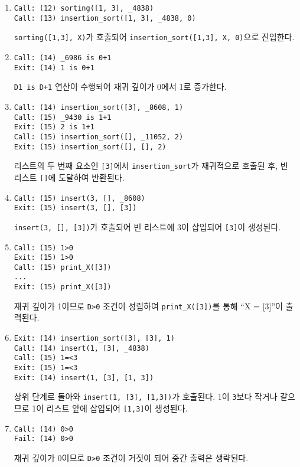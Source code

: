 \documentclass{article}
\begin{document}
\begin{enumerate}

\item
\begin{verbatim}
Call: (12) sorting([1, 3], _4838)
Call: (13) insertion_sort([1, 3], _4838, 0)
\end{verbatim}
\texttt{sorting([1,3], X)}가 호출되어 \texttt{insertion\_sort([1,3], X, 0)}으로 진입한다.

\item
\begin{verbatim}
Call: (14) _6986 is 0+1
Exit: (14) 1 is 0+1
\end{verbatim}
\texttt{D1 is D+1} 연산이 수행되어 재귀 깊이가 0에서 1로 증가한다.

\item
\begin{verbatim}
Call: (14) insertion_sort([3], _8608, 1)
Call: (15) _9430 is 1+1
Exit: (15) 2 is 1+1
Call: (15) insertion_sort([], _11052, 2)
Exit: (15) insertion_sort([], [], 2)
\end{verbatim}
리스트의 두 번째 요소인 \texttt{[3]}에서 \texttt{insertion\_sort}가 재귀적으로 호출된 후, 빈 리스트 \texttt{[]}에 도달하여 반환된다.

\item
\begin{verbatim}
Call: (15) insert(3, [], _8608)
Exit: (15) insert(3, [], [3])
\end{verbatim}
\texttt{insert(3, [], [3])}가 호출되어 빈 리스트에 3이 삽입되어 \texttt{[3]}이 생성된다.

\item
\begin{verbatim}
Call: (15) 1>0
Exit: (15) 1>0
Call: (15) print_X([3])
...
Exit: (15) print_X([3])
\end{verbatim}
재귀 깊이가 1이므로 \texttt{D>0} 조건이 성립하여 \texttt{print\_X([3])}를 통해 “X = [3]”이 출력된다.

\item
\begin{verbatim}
Exit: (14) insertion_sort([3], [3], 1)
Call: (14) insert(1, [3], _4838)
Call: (15) 1=<3
Exit: (15) 1=<3
Exit: (14) insert(1, [3], [1, 3])
\end{verbatim}
상위 단계로 돌아와 \texttt{insert(1, [3], [1,3])}가 호출된다. 1이 \texttt{3}보다 작거나 같으므로 1이 리스트 앞에 삽입되어 \texttt{[1,3]}이 생성된다.

\item
\begin{verbatim}
Call: (14) 0>0
Fail: (14) 0>0
\end{verbatim}
재귀 깊이가 0이므로 \texttt{D>0} 조건이 거짓이 되어 중간 출력은 생략된다.


\end{enumerate}
\end{document}
